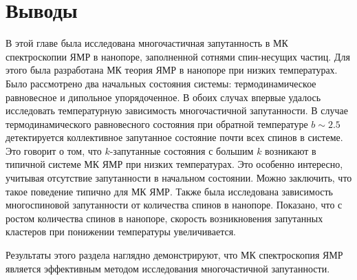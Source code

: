 \section{Выводы}
\label{sec:conslusions}

В этой главе была исследована многочастичная запутанность в МК спектроскопии ЯМР в нанопоре, заполненной сотнями спин-несущих частиц.
Для этого была разработана МК теория ЯМР в нанопоре при низких температурах.
Было рассмотрено два начальных состояния системы:
термодинамическое равновесное
и дипольное упорядоченное.
В обоих случах впервые удалось исследовать температурную зависимость многочастичной запутанности.
В случае термодинамического равновесного состояния при обратной температуре $b \sim 2.5$ детектируется коллективное запутанное состояние почти всех спинов в системе.
Это говорит о том, что $k$-запутанные состояния с большим $k$ возникают в типичной системе МК ЯМР при низких температурах.
Это особенно интересно, учитывая отсутствие запутанности в начальном состоянии.
Можно заключить, что такое поведение типично для МК ЯМР.
Также была исследована зависимость многоспиновой запутанности
от количества спинов в нанопоре.
Показано, что с ростом количества спинов в нанопоре,
скорость возникновения запутанных кластеров при понижении температуры увеличивается.

Результаты этого раздела наглядно демонстрируют,
что МК спектроскопия ЯМР является эффективным методом исследования многочастичной запутанности.
